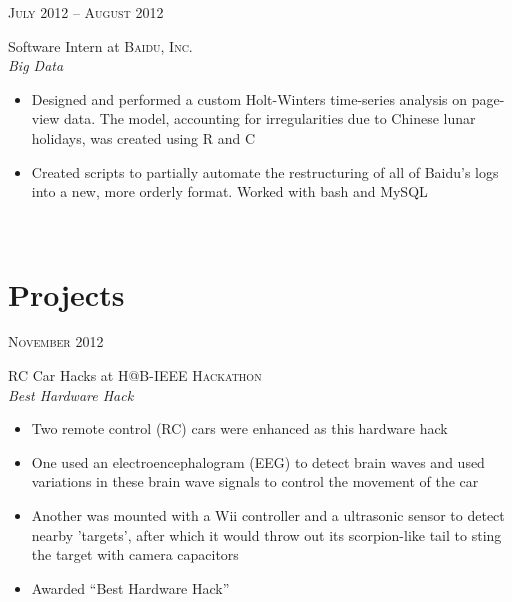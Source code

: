 \documentclass[10pt]{article} %
\begin{document}
{\begin{minipage}[t]{0.5\textwidth}

{\raggedleft\textsc{July 2012 -- August 2012}\par}

{\raggedright\large Software Intern at \textsc{Baidu, Inc.}\\
\textit{Big Data}\\[5pt]}

\normalsize{
  \begin{itemize}
  \item Designed and performed a custom Holt-Winters time-series analysis
    on page-view data. The model, accounting for irregularities due to
    Chinese lunar holidays, was created using R and C
  \item Created scripts to partially automate the restructuring of all of
    Baidu's logs into a new, more orderly format. Worked with bash and
    MySQL
  \end{itemize}
}\\


\section{Projects} 


{\raggedleft\textsc{November 2012}\par}

{\raggedright\large RC Car Hacks at \textsc{H@B-IEEE Hackathon}\\
\textit{Best Hardware Hack}\\[5pt]}

\normalsize{
  \begin{itemize}
  \item Two remote control (RC) cars were enhanced as this hardware hack
  \item One used an electroencephalogram (EEG) to detect brain waves and
    used variations in these brain wave signals to control the movement of
    the car
  \item Another was mounted with a Wii controller and a ultrasonic sensor
    to detect nearby 'targets', after which it would throw out its
    scorpion-like tail to sting the target with camera capacitors
  \item Awarded ``Best Hardware Hack''
  \end{itemize}
}\\


\end{minipage}}
\end{document}

